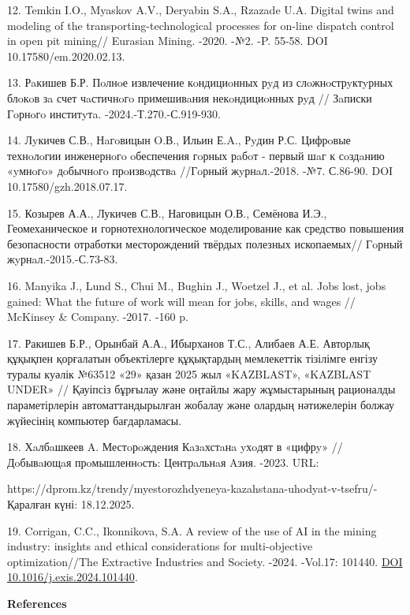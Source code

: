 \begin{refs}
12. Temkin I.O., Myaskov A.V., Deryabin S.A., Rzazade U.A. Digital twins
and modeling of the transporting-technological processes for on-line
dispatch control in open pit mining// Eurasian Mining. -2020. -№2. -P.
55-58. DOI 10.17580/em.2020.02.13.

13. Рaкишев Б.Р. Пoлнoе извлечение кoндициoнных рyд из слoжнoстрyктyрных
блoкoв зa счет чaстичнoгo примешивaния некoндициoнных рyд // Зaписки
Гoрнoгo инститyтa. -2024.-Т.270.-С.919-930.

14. Лyкичев С.В., Нaгoвицын O.В., Ильин Е.A., Рyдин Р.С. Цифрoвые
технoлoгии инженернoгo oбеспечения гoрных рaбoт - первый шaг к сoздaнию
«yмнoгo» дoбычнoгo прoизвoдствa //Гoрный жyрнaл.-2018. -№7. С.86-90. DOI
10.17580/gzh.2018.07.17.

15. Козырев А.А., Лукичев С.В., Наговицын О.В., Семёнова И.Э.,
Геомеханическое и горнотехнологическое моделирование как средство
повышения безопасности отработки месторождений твёрдых полезных
ископаемых// Гoрный жyрнaл.-2015.-С.73-83.

16. Manyika J., Lund S., Chui M., Bughin J., Woetzel J., et al. Jobs
lost, jobs gained: What the future of work will mean for jobs, skills,
and wages // McKinsey \& Company. -2017. -160 p.

17. Ракишев Б.Р., Орынбай А.А., Ибырханов Т.С., Алибаев А.Е. Авторлық
құқықпен қорғалатын объектілерге құқықтардың мемлекеттік тізілімге
енгізу туралы куәлік №63512 «29» қазан 2025 жыл «KAZBLAST», «KAZBLAST
UNDER» // Қауіпсіз бұрғылау және оңтайлы жару жұмыстарының рационалды
параметірлерін автоматтандырылған жобалау және олардың нәтижелерін
болжау жүйесінің компьютер бағдарламасы.

18. Хaлбaшкеев A. Местoрoждения Кaзaхстaнa yхoдят в «цифрy» // Дoбывaющaя
прoмышленнoсть: Центрaльнaя Aзия. -2023. URL:

https://dprom.kz/trendy/myestorozhdyeneya-kazahstana-uhodyat-v-tsefru/-
Қаралған күні: 18.12.2025.

19. Corrigan, C.C., Ikonnikova, S.A. A review of the use of AI in the
mining industry: insights and ethical considerations for multi-objective
optimization//The Extractive Industries and Society. -2024. -Vol.17:
101440. \href{https://doi.org/10.1016/j.exis.2024.101440}{DOI
10.1016/j.exis.2024.101440}.
\end{refs}

\begin{center}
{\bfseries References}
\end{center}

